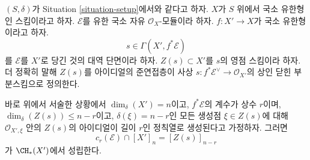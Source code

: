 \medskip\noindent
$(S, \delta)$가 Situation \ref{situation-setup}에서와 같다고 하자.
$X$가 $S$ 위에서 국소 유한형인 스킴이라고 하자. $\mathcal{E}$를 유한
국소 자유 $\mathcal{O}_X$-모듈이라 하자. $f : X' \to X$가 국소
유한형이라고 하자.
$$
s \in \Gamma(X', f^*\mathcal{E})
$$
를 $\mathcal{E}$를 $X'$로 당긴 것의 대역 단면이라 하자.
$Z(s) \subset X'$를 $s$의 영점 스킴이라 하자. 더 정확히 말해
$Z(s)$를 아이디얼의 준연접층이 사상
$s : f^*\mathcal{E}^\vee \to \mathcal{O}_{X'}$의 상인 닫힌
부분스킴으로 정의한다.

\begin{lemma}
\label{lemma-top-chern-class}
바로 위에서 서술한 상황에서 $\dim_\delta(X') = n$이고,
$f^*\mathcal{E}$의 계수가 상수 $r$이며,
$\dim_\delta(Z(s)) \leq n - r$이고, $\delta(\xi) = n - r$인
모든 생성점 $\xi \in Z(s)$에 대해
$\mathcal{O}_{X', \xi}$ 안의 $Z(s)$의 아이디얼이 길이 $r$인 정칙열로
생성된다고 가정하자. 그러면
$$
c_r(\mathcal{E}) \cap [X']_n = [Z(s)]_{n - r}
$$
가 $\CH_*(X')$에서 성립한다.
\end{lemma}

